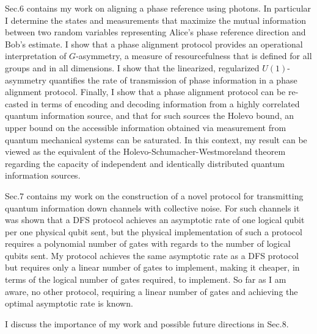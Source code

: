 \documentclass{article}
\begin{document}
Sec.6 contains my work on aligning a phase reference using photons.  In particular I determine the states and measurements that maximize the mutual information between two random variables representing Alice's phase reference direction and Bob's estimate.  I show that a phase alignment protocol provides an operational interpretation of $G$-asymmetry, a measure of resourcefulness that is defined for all groups and in all dimensions.  I show that the linearized, regularized $U(1)$-asymmetry quantifies the rate of transmission of phase information in a phase alignment protocol.  Finally, I show that a phase alignment protocol can be re-casted in terms of encoding and decoding information from a highly correlated quantum information source, and that for such sources the Holevo bound, an upper bound on the accessible information obtained via measurement from quantum mechanical systems can be saturated. In this context, my result can be viewed as the equivalent of the Holevo-Schumacher-Westmoreland theorem regarding the capacity of independent and identically distributed quantum information sources.    

Sec.7 contains my work on the construction of a novel protocol for transmitting quantum information down channels with collective noise.  For such channels it was shown that a DFS protocol achieves an asymptotic rate of one logical qubit per one physical qubit sent, but the physical implementation of such a protocol requires a polynomial number of gates with regards to the number of logical qubits sent.  My protocol achieves the same asymptotic rate as a DFS protocol but requires only a linear number of gates to implement, making it cheaper, in terms of the logical number of gates required, to implement.  So far as I am aware, no other protocol, requiring a linear number of gates and achieving the optimal asymptotic rate is known.

I discuss the importance of my work and possible future directions in Sec.8.  
\end{document}
